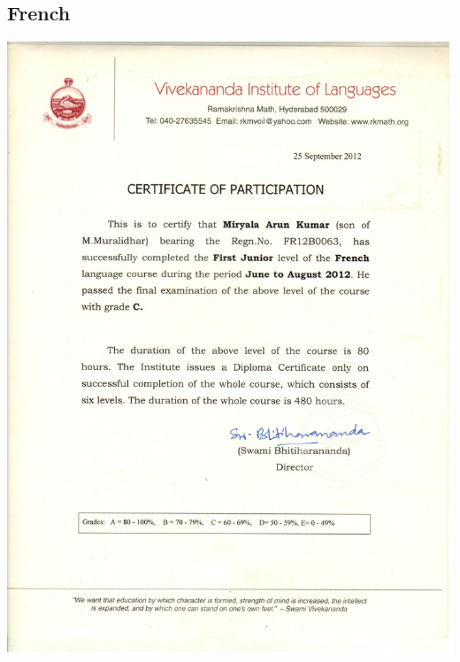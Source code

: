 \documentclass{article}
\begin{document}
	\subsection{French}
		\includegraphics[page=1, scale=0.5]{proofs/french.pdf}\\
\end{document}
